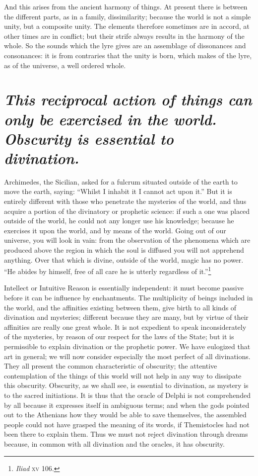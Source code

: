 \documentclass[12pt]{article}
\begin{document}
And this arises from the ancient harmony of things. At present there is between
the different parts, as in a family, dissimilarity; because the world is not a
simple unity, but a composite unity. The elements therefore sometimes are in
accord, at other times are in conflict; but their strife always results in the
harmony of the whole. So the sounds which the lyre gives are an assemblage of
dissonances and consonances: it is from contraries that the unity is born,
which makes of the lyre, as of the universe, a well ordered whole.


\section{\mdseries\itshape This reciprocal action of things can only be
exercised in the world.  Obscurity is essential to divination.}

Archimedes, the Sicilian, asked for a fulcrum situated outside of the earth to
move the earth, saying: ``Whilst I inhabit it I cannot act upon it.'' But it is
entirely different with those who penetrate the mysteries of the world, and
thus acquire a portion of the divinatory or prophetic science: if such a one
was placed outside of the world, he could not any longer use his knowledge;
because he exercises it upon the world, and by means of the world. Going out of
our universe, you will look in vain: from the observation of the phenomena
which are produced above the region in which the soul is diffused you will not
apprehend anything. Over that which is divine, outside of the world, magic has
no power. ``He abides by himself, free of all care he is utterly regardless of
it.''\footnote{\textit{Iliad} \textsc{xv} 106.}

Intellect or Intuitive Reason is essentially independent: it must become
passive before it can be influence by enchantments. The multiplicity of beings
included in the world, and the affinities existing between them, give birth to
all kinds of divination and mysteries; different because they are many, but by
virtue of their affinities are really one great whole. It is not expedient to
speak inconsiderately of the mysteries, by reason of our respect for the laws
of the State; but it is permissible to explain divination or the prophetic
power. We have eulogized that art in general; we will now consider especially
the most perfect of all divinations. They all present the common characteristic
of obscurity; the attentive contemplation of the things of this world will not
help in any way to dissipate this obscurity. Obscurity, as we shall see, is
essential to divination, as mystery is to the sacred initiations. It is thus
that the oracle of Delphi is not comprehended by all because it expresses
itself in ambiguous terms; and when the gods pointed out to the Athenians how
they would be able to save themselves, the assembled people could not have
grasped the meaning of its words, if Themistocles had not been there to explain
them. Thus we must not reject divination through dreams because, in common with
all divination and the oracles, it has obscurity.
\end{document}
